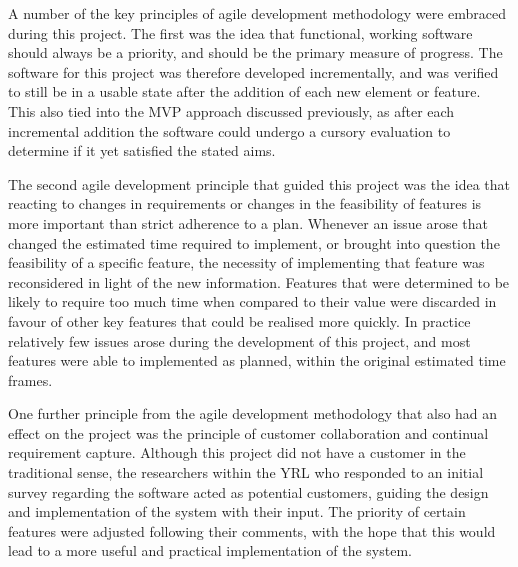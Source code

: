 A number of the key principles of agile development methodology were embraced during this project. The first was the idea that functional, working software should always be a priority, and should be the primary measure of progress. The software for this project was therefore developed incrementally, and was verified to still be in a usable state after the addition of each new element or feature. This also tied into the MVP approach discussed previously, as after each incremental addition the software could undergo a cursory evaluation to determine if it yet satisfied the stated aims. 

The second agile development principle that guided this project was the idea that reacting to changes in requirements or changes in the feasibility of features is more important than strict adherence to a plan. Whenever an issue arose that changed the estimated time required to implement, or brought into question the feasibility of a specific feature, the necessity of implementing that feature was reconsidered in light of the new information. Features that were determined to be likely to require too much time when compared to their value were discarded in favour of other key features that could be realised more quickly. In practice relatively few issues arose during the development of this project, and most features were able to implemented as planned, within the original estimated time frames.

One further principle from the agile development methodology that also had an effect on the project was the principle of customer collaboration and continual requirement capture. Although this project did not have a customer in the traditional sense, the researchers within the YRL who responded to an initial survey regarding the software acted as potential customers, guiding the design and implementation of the system with their input. The priority of certain features were adjusted following their comments, with the hope that this would lead to a more useful and practical implementation of the system.

